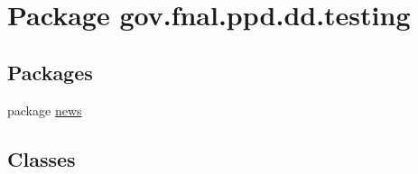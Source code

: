 \hypertarget{namespacegov_1_1fnal_1_1ppd_1_1dd_1_1testing}{\section{Package gov.\-fnal.\-ppd.\-dd.\-testing}
\label{namespacegov_1_1fnal_1_1ppd_1_1dd_1_1testing}
}
\subsection*{Packages}
\begin{DoxyCompactItemize}
\item 
package \hyperlink{namespacegov_1_1fnal_1_1ppd_1_1dd_1_1testing_1_1news}{news}
\end{DoxyCompactItemize}
\subsection*{Classes}
